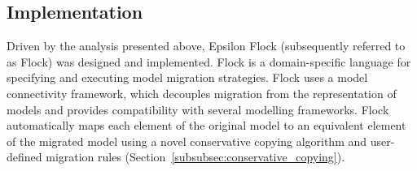 % 
% 
% 


\subsection{Implementation}
\label{subsec:flock_implementation}
Driven by the analysis presented above, Epsilon Flock (subsequently referred to as Flock) was designed and implemented. Flock is a domain-specific language for specifying and executing model migration strategies. Flock uses a model connectivity framework, which decouples migration from the representation of models and provides compatibility with several modelling frameworks. Flock automatically maps each element of the original model to an equivalent element of the migrated model using a novel conservative copying algorithm and user-defined migration rules (Section~\ref{subsubsec:conservative_copying}).


